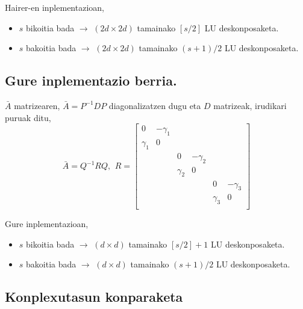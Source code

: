 \begin{enumerate}
\end{enumerate}

Hairer-en inplementazioan,
\begin{itemize}
\item $s$ bikoitia bada $\rightarrow$ $(2d \times 2d)$ tamainako $[s/2]$  LU deskonposaketa.
\item $s$ bakoitia bada $\rightarrow$ $(2d \times 2d)$ tamainako $(s+1)/2$  LU deskonposaketa.
\end{itemize}

\subsection*{Gure inplementazio berria.}

$\bar{A}$ matrizearen, $\bar{A}=P^{-1}DP$ diagonalizatzen dugu eta $D$ matrizeak, irudikari puruak ditu,
\begin{equation*}
\bar{A}=Q^{-1}RQ, \ \,
R=\begin{bmatrix}
0           & -\gamma_{1}   &            &               &             &           \\
 \gamma_{1} & 0             &            &               &             &           \\
            &               & 0           & -\gamma_{2}  &             &           \\
            &               & \gamma_{2}  & 0              &           &           \\
            &               &             &                & 0            & -\gamma_{3} \\
            &               &             &                & \gamma_{3}   & 0            \\
\end{bmatrix}
\end{equation*}

Gure inplementazioan,
\begin{itemize}
\item $s$ bikoitia bada $\rightarrow$ $(d \times d)$ tamainako $[s/2]+1$  LU deskonposaketa.
\item $s$ bakoitia bada $\rightarrow$ $(d \times d)$ tamainako $(s+1)/2$  LU deskonposaketa.
\end{itemize}

\subsection*{Konplexutasun konparaketa}

